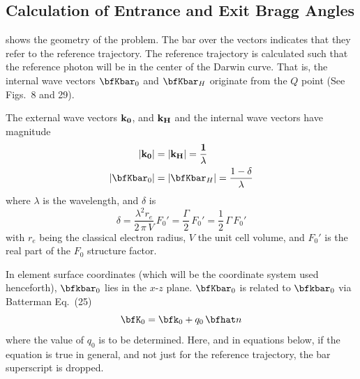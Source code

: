 \subsection{Calculation of Entrance and Exit Bragg Angles}
\label{s:crystal.ref}

 shows the geometry of the
problem. The bar over the vectors indicates that they refer to the
reference trajectory. The reference trajectory is calculated such that
the reference photon will be in the center of the Darwin curve. That
is, the internal wave vectors $\bfKbar_0$ and $\bfKbar_H$ originate
from the $Q$ point (See \cite{b:batterman} Figs.~8 and 29).

The external wave vectors $\bf k_0$, and $\bf k_H$ and the internal wave vectors
have magnitude
\begin{align}
  |\bf k_0| &= |\bf k_H| = \frac{1}{\lambda} 
  \label{kk1l1} \\
  |\bfKbar_0| &= |\bfKbar_H| = \frac{1 - \delta}{\lambda}
  \label{kk1l2}
\end{align}
where $\lambda$ is the wavelength, and $\delta$ is
\begin{equation}
  \delta = \frac{\lambda^2 r_e}{2 \, \pi \, V} \, F_0' = \frac{\Gamma}{2} \, F_0'
  = \frac{1}{2} \, \Gamma \, F_0'
\end{equation}
with $r_e$ being the classical electron radius, $V$ the unit cell
volume, and $F_0'$ is the real part of the $F_0$ structure factor. 

In element surface coordinates (which will be the coordinate system used
henceforth), $\bfkbar_0$ lies in the $x$-$z$ plane. $\bfKbar_0$ is
related to $\bfkbar_0$ via Batterman Eq.~(25)
\begin{equation}
  \bfK_0 = \bfk_0 + q_0 \, \bfhat n
  \label{kkqn1}
\end{equation}
where the value of $q_0$ is to be determined. Here, and in equations
below, if the equation is true in general, and not just for the
reference trajectory, the bar superscript is dropped.

